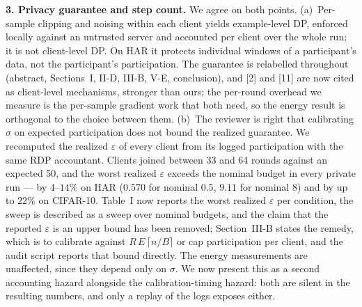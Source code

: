 \documentclass[10pt,a4paper]{article}
\begin{document}
\textbf{3. Privacy guarantee and step count.} We agree on both points.
(a)~Per-sample clipping and noising within each client yields example-level DP,
enforced locally against an untrusted server and accounted per client over the
whole run; it is not client-level DP. On HAR it protects individual windows of
a participant's data, not the participant's participation. The guarantee is
relabelled throughout (abstract, Sections~I, II-D, III-B, V-E, conclusion), and
[2] and [11] are now cited as client-level mechanisms, stronger than ours; the
per-round overhead we measure is the per-sample gradient work that both need,
so the energy result is orthogonal to the choice between them. (b)~The reviewer
is right that calibrating $\sigma$ on expected participation does not bound the
realized guarantee. We recomputed the realized $\varepsilon$ of every client
from its logged participation with the same RDP accountant. Clients joined
between 33 and 64 rounds against an expected 50, and the worst realized
$\varepsilon$ exceeds the nominal budget in every private run --- by $4$--$14\%$
on HAR ($0.570$ for nominal $0.5$, $9.11$ for nominal $8$) and by up to $22\%$
on CIFAR-10. Table~I now reports the worst realized $\varepsilon$ per
condition, the sweep is described as a sweep over nominal budgets, and the
claim that the reported $\varepsilon$ is an upper bound has been removed;
Section~III-B states the remedy, which is to calibrate against
$R\,E\,\lceil n/B \rceil$ or cap participation per client, and the audit script
reports that bound directly. The energy measurements are unaffected, since they
depend only on $\sigma$. We now present this as a second accounting hazard
alongside the calibration-timing hazard: both are silent in the resulting
numbers, and only a replay of the logs exposes either.
\end{document}
